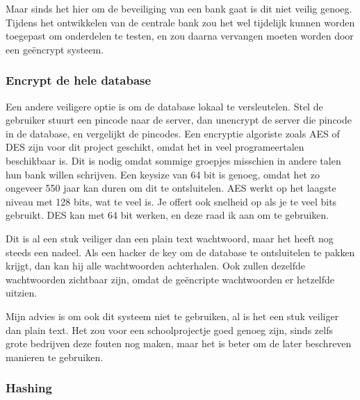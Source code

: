 \documentclass{article}
\begin{document}
Maar sinds het hier om de beveiliging van een bank gaat is dit niet veilig genoeg.
Tijdens het ontwikkelen van de centrale bank zou het wel tijdelijk kunnen worden toegepast om onderdelen te testen, en zou daarna vervangen moeten worden door een ge\"encrypt systeem.

\subsubsection{Encrypt de hele database}

Een andere veiligere optie is om de database lokaal te versleutelen.
Stel de gebruiker stuurt een pincode naar de server, dan unencrypt de server die pincode in de database, en vergelijkt de pincodes.
Een encryptie algoriste zoals AES of DES zijn voor dit project geschikt, omdat het in veel programeertalen beschikbaar is.
Dit is nodig omdat sommige groepjes misschien in andere talen hun bank willen schrijven.
Een keysize van 64 bit is genoeg, omdat het zo ongeveer 550 jaar kan duren om dit te ontsluitelen.
AES werkt op het laagste niveau met 128 bits, wat te veel is.
Je offert ook snelheid op als je te veel bits gebruikt.
DES kan met 64 bit werken, en deze raad ik aan om te gebruiken.

Dit is al een stuk veiliger dan een plain text wachtwoord, maar het heeft nog steeds een nadeel.
Als een hacker de key om de database te ontsluitelen te pakken krijgt, dan kan hij alle wachtwoorden achterhalen.
Ook zullen dezelfde wachtwoorden zichtbaar zijn, omdat de ge\"encripte wachtwoorden er hetzelfde uitzien.

Mijn advies is om ook dit systeem niet te gebruiken, al is het een stuk veiliger dan plain text.
Het zou voor een schoolprojectje goed genoeg zijn, sinds zelfs grote bedrijven deze fouten nog maken, maar het is beter om de later beschreven manieren te gebruiken.

\newpage

\subsubsection{Hashing}
\end{document}
